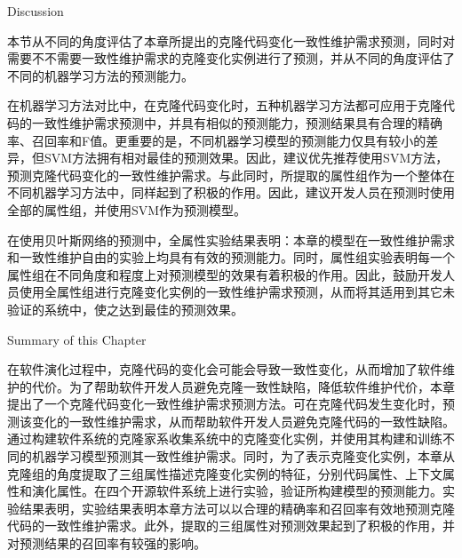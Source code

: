 
{Discussion}

本节从不同的角度评估了本章所提出的克隆代码变化一致性维护需求预测，同时对需要不不需要一致性维护需求的克隆变化实例进行了预测，并从不同的角度评估了不同的机器学习方法的预测能力。

在机器学习方法对比中，在克隆代码变化时，五种机器学习方法都可应用于克隆代码的一致性维护需求预测中，并具有相似的预测能力，预测结果具有合理的精确率、召回率和F值。更重要的是，不同机器学习模型的预测能力仅具有较小的差异，但SVM方法拥有相对最佳的预测效果。因此，建议优先推荐使用SVM方法，预测克隆代码变化的一致性维护需求。与此同时，所提取的属性组作为一个整体在不同机器学习方法中，同样起到了积极的作用。因此，建议开发人员在预测时使用全部的属性组，并使用SVM作为预测模型。

在使用贝叶斯网络的预测中，全属性实验结果表明：本章的模型在一致性维护需求和一致性维护自由的实验上均具有有效的预测能力。同时，属性组实验表明每一个属性组在不同角度和程度上对预测模型的效果有着积极的作用。因此，鼓励开发人员使用全属性组进行克隆变化实例的一致性维护需求预测，从而将其适用到其它未验证的系统中，使之达到最佳的预测效果。

{Summary of this Chapter}

在软件演化过程中，克隆代码的变化会可能会导致一致性变化，从而增加了软件维护的代价。为了帮助软件开发人员避免克隆一致性缺陷，降低软件维护代价，本章提出了一个克隆代码变化一致性维护需求预测方法。可在克隆代码发生变化时，预测该变化的一致性维护需求，从而帮助软件开发人员避免克隆代码的一致性缺陷。通过构建软件系统的克隆家系收集系统中的克隆变化实例，并使用其构建和训练不同的机器学习模型预测其一致性维护需求。同时，为了表示克隆变化实例，本章从克隆组的角度提取了三组属性描述克隆变化实例的特征，分别代码属性、上下文属性和演化属性。在四个开源软件系统上进行实验，验证所构建模型的预测能力。实验结果表明，实验结果表明本章方法可以以合理的精确率和召回率有效地预测克隆代码的一致性维护需求。此外，提取的三组属性对预测效果起到了积极的作用，并对预测结果的召回率有较强的影响。


